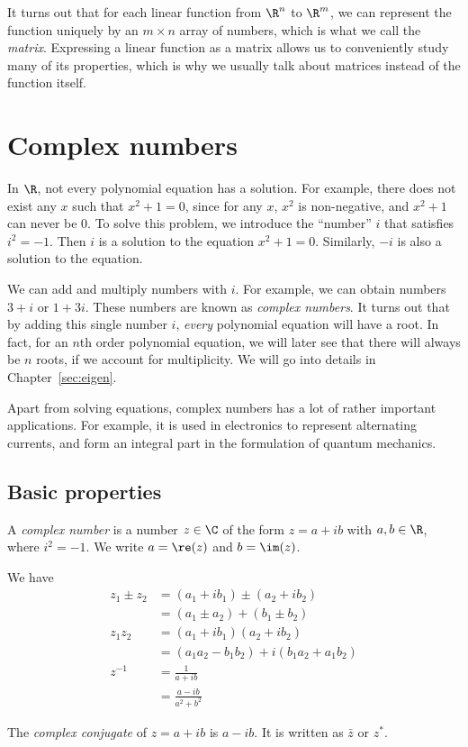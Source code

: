 \documentclass[a4paper]{article}
\begin{document}
It turns out that for each linear function from $\R^n$ to $\R^m$, we can represent the function uniquely by an $m\times n$ array of numbers, which is what we call the \emph{matrix}. Expressing a linear function as a matrix allows us to conveniently study many of its properties, which is why we usually talk about matrices instead of the function itself.

\section{Complex numbers}
In $\R$, not every polynomial equation has a solution. For example, there does not exist any $x$ such that $x^2 + 1 = 0$, since for any $x$, $x^2$ is non-negative, and $x^2 + 1$ can never be $0$. To solve this problem, we introduce the ``number'' $i$ that satisfies $i^2 = -1$. Then $i$ is a solution to the equation $x^2 + 1 = 0$. Similarly, $-i$ is also a solution to the equation.

We can add and multiply numbers with $i$. For example, we can obtain numbers $3 + i$ or $1 + 3i$. These numbers are known as \emph{complex numbers}. It turns out that by adding this single number $i$, \emph{every} polynomial equation will have a root. In fact, for an $n$th order polynomial equation, we will later see that there will always be $n$ roots, if we account for multiplicity. We will go into details in Chapter~\ref{sec:eigen}.

Apart from solving equations, complex numbers has a lot of rather important applications. For example, it is used in electronics to represent alternating currents, and form an integral part in the formulation of quantum mechanics.

\subsection{Basic properties}
\begin{defi}
  A \emph{complex number} is a number $z\in \C$ of the form $z = a + ib$ with $a, b\in \R$, where $i^2=-1$. We write $a = \re(z)$ and $b = \im(z)$.
\end{defi}

We have
\begin{align*}
  z_1\pm z_2 &= (a_1 + ib_1)\pm (a_2 + ib_2)\\
  &= (a_1\pm a_2) + (b_1 \pm b_2)\\
  z_1z_2 &= (a_1 + ib_1)(a_2 + ib_2)\\
  &= (a_1a_2 - b_1b_2) + i(b_1a_2 + a_1b_2)\\
  z^{-1} &= \frac{1}{a + ib}\\
  &= \frac{a - ib}{a^2 + b^2}
\end{align*}
\begin{defi}
  The \emph{complex conjugate} of $z = a+ ib$ is $a - ib$. It is written as $\bar{z}$ or $z^*$.
\end{defi}
\end{document}
